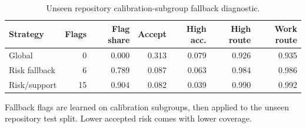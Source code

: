 \begin{table}[t]
\centering
\scriptsize
\caption{Unseen repository calibration-subgroup fallback diagnostic.}
\label{tab:aidev-local-fallback}
\setlength{\tabcolsep}{2pt}
\begin{tabular}{lrrrrrr}
\toprule
Strategy & Flags & Flag share & Accept & High acc. & High route & Work route \\
\midrule
Global & 0 & 0.000 & 0.313 & 0.079 & 0.926 & 0.935 \\
Risk fallback & 6 & 0.789 & 0.087 & 0.063 & 0.984 & 0.986 \\
Risk/support & 15 & 0.904 & 0.082 & 0.039 & 0.990 & 0.992 \\
\bottomrule
\end{tabular}
\par\footnotesize{Fallback flags are learned on calibration subgroups, then applied to the unseen repository test split. Lower accepted risk comes with lower coverage.}
\end{table}
